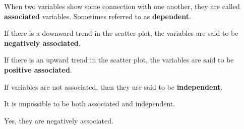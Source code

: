 \documentclass{beamer}
\begin{document}
\begin{frame}
\begin{definition}
When two variables show some connection with one another, they are called \textbf{associated} variables. Sometimes referred to as \textbf{dependent}.
\end{definition}\pause

\begin{definition}
If there is a downward trend in the scatter plot, the variables are said to be \textbf{negatively associated}.
\end{definition}\pause

\begin{definition}
If there is an upward trend in the scatter plot, the variables are said to be \textbf{positive associated}.
\end{definition}\pause

\begin{definition}
If variables are not associated, then they are said to be \textbf{independent}.
\end{definition}\pause

\begin{note}
It is impossible to be both associated and independent.
\end{note}
\end{frame}

\begin{frame}
\begin{example}
\pause

Yes, they are negatively associated.
\end{example}
\end{frame}
\end{document}
